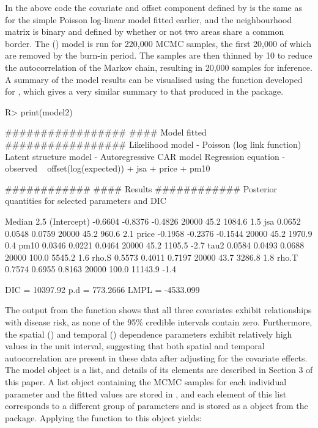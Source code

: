 \documentclass[article, nojss]{jss}
\begin{document}
In the above code the covariate and offset component defined by  is the same as for the simple Poisson log-linear model fitted earlier, and the neighbourhood matrix is binary and defined by whether or not two areas share a common border. The () model is run for 220,000 MCMC samples, the first 20,000 of which are removed by the burn-in period. The samples are then thinned by 10 to reduce the autocorrelation of the Markov chain, resulting in 20,000 samples for inference. A summary of the model results can be visualised using the  function developed for , which gives a very similar summary to that produced in the  package.

\begin{CodeInput}
R> print(model2)
\end{CodeInput}


\begin{CodeOutput}
#################
#### Model fitted
#################
Likelihood model - Poisson (log link function) 
Latent structure model - Autoregressive CAR model
Regression equation - observed ~ offset(log(expected)) + jsa + price + pm10

############
#### Results
############
Posterior quantities for selected parameters and DIC

             Median    2.5%
(Intercept) -0.6604 -0.8376 -0.4826    20000     45.2      1084.6         1.5
jsa          0.0652  0.0548  0.0759    20000     45.2       960.6         2.1
price       -0.1958 -0.2376 -0.1544    20000     45.2      1970.9         0.4
pm10         0.0346  0.0221  0.0464    20000     45.2      1105.5        -2.7
tau2         0.0584  0.0493  0.0688    20000    100.0      5545.2         1.6
rho.S        0.5573  0.4011  0.7197    20000     43.7      3286.8         1.8
rho.T        0.7574  0.6955  0.8163    20000    100.0     11143.9        -1.4

DIC =  10397.92       p.d =  773.2666       LMPL =  -4533.099 
\end{CodeOutput}


The output from the  function shows that all three covariates exhibit relationships with disease risk, as none of the 95\% credible intervals contain zero. Furthermore, the spatial () and temporal () dependence parameters exhibit relatively high values in the unit interval, suggesting that both spatial and temporal autocorrelation are present in these data after adjusting for the covariate effects. The model object  is a list, and details of its elements are described in Section 3 of this paper. A list object containing the MCMC samples for each individual parameter and the fitted values are stored in , and each element of this list corresponds to a different group of parameters and is stored as a   object from the  package.  Applying the  function to this object yields:
\end{document}
